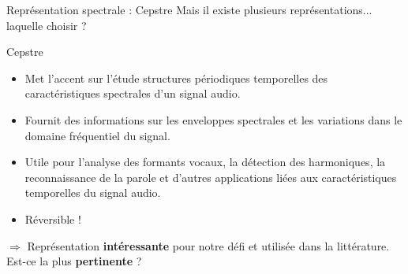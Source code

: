 \documentclass[compress,xcolor=table]{beamer}
\begin{document}
\begin{frame}{Représentation spectrale : Cepstre}
    Mais il existe plusieurs représentations... laquelle choisir ?

    \begin{block}{Cepstre}

        \begin{itemize}
            \item Met l'accent sur l'étude structures périodiques temporelles des caractéristiques spectrales d'un signal audio.
            \item Fournit des informations sur les enveloppes spectrales et les variations dans le domaine fréquentiel du signal.
            \item Utile pour l'analyse des formants vocaux, la détection des harmoniques, la reconnaissance de la parole et d'autres applications liées aux caractéristiques temporelles du signal audio.
            \item Réversible !
        \end{itemize}

    \end{block}

    $\Rightarrow$ Représentation \textbf{intéressante} pour notre défi et utilisée dans la littérature. Est-ce la plus \textbf{pertinente} ?

\end{frame}
\end{document}
